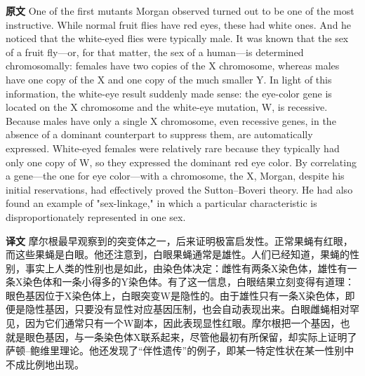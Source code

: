 \documentclass[UTF8,zihao=-4]{ctexart}
\newcommand{\BodyFont}{\fontsize{10.5pt}{15.5pt}\selectfont}
\renewenvironment{quote}{\par\noindent\begingroup\BodyFont}{\par\endgroup}
\begin{document}
\begin{quote}
\noindent\textbf{原文} One of the first mutants Morgan observed turned out to be one of the most instructive. While normal fruit flies have red eyes, these had white ones. And he noticed that the white-eyed flies were typically male. It was known that the sex of a fruit fly---or, for that matter, the sex of a human---is determined chromosomally: females have two copies of the X chromosome, whereas males have one copy of the X and one copy of the much smaller Y. In light of this information, the white-eye result suddenly made sense: the eye-color gene is located on the X chromosome and the white-eye mutation, W, is recessive. Because males have only a single X chromosome, even recessive genes, in the absence of a dominant counterpart to suppress them, are automatically expressed. White-eyed females were relatively rare because they typically had only one copy of W, so they expressed the dominant red eye color. By correlating a gene---the one for eye color---with a chromosome, the X, Morgan, despite his initial reservations, had effectively proved the Sutton--Boveri theory. He had also found an example of "sex-linkage," in which a particular characteristic is disproportionately represented in one sex.

\smallskip
\noindent\textbf{译文} 摩尔根最早观察到的突变体之一，后来证明极富启发性。正常果蝇有红眼，而这些果蝇是白眼。他还注意到，白眼果蝇通常是雄性。人们已经知道，果蝇的性别，事实上人类的性别也是如此，由染色体决定：雌性有两条X染色体，雄性有一条X染色体和一条小得多的Y染色体。有了这一信息，白眼结果立刻变得有道理：眼色基因位于X染色体上，白眼突变W是隐性的。由于雄性只有一条X染色体，即便是隐性基因，只要没有显性对应基因压制，也会自动表现出来。白眼雌蝇相对罕见，因为它们通常只有一个W副本，因此表现显性红眼。摩尔根把一个基因，也就是眼色基因，与一条染色体X联系起来，尽管他最初有所保留，却实际上证明了萨顿--鲍维里理论。他还发现了“伴性遗传”的例子，即某一特定性状在某一性别中不成比例地出现。
\end{quote}
\end{document}
